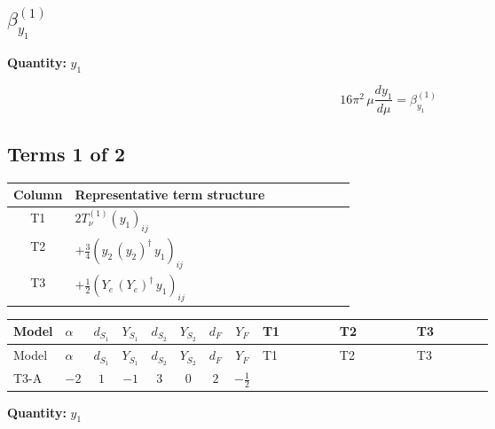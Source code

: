 \documentclass[8pt]{article}
\begin{document}
\begin{landscape}
\section*{$\beta_{y_1}^{(1)}$}
\noindent\textbf{Quantity: }$y_1$\par\smallskip
\[16\pi^2\,\mu\frac{d y_1}{d\mu}=\beta_{y_1}^{(1)}\]
\subsection*{Terms 1 of 2}
\begin{center}
\begin{tabular}{@{}c >{\raggedright\arraybackslash}p{0.82\linewidth}@{}}
\toprule
Column & Representative term structure \\
\midrule
T1 & \(\displaystyle 2 T_{\nu}^{(1)} \left({y_1}\right)_{ij}\) \\
\midrule
T2 & \(\displaystyle +\frac{3}{4} \left({y_2}\,\left({y_2}\right)^{\dagger}\,{y_1}\right)_{ij}\) \\
\midrule
T3 & \(\displaystyle +\frac{1}{2} \left({Y_e}\,\left({Y_e}\right)^{\dagger}\,{y_1}\right)_{ij}\) \\
\midrule
\bottomrule
\end{tabular}
\end{center}
\smallskip
\tiny
\begin{longtable}{@{}llcccccc >{\raggedright\arraybackslash}p{0.21\linewidth} >{\raggedright\arraybackslash}p{0.21\linewidth} >{\raggedright\arraybackslash}p{0.21\linewidth}@{}}
\toprule
Model & $\alpha$ & $d_{S_1}$ & $Y_{S_1}$ & $d_{S_2}$ & $Y_{S_2}$ & $d_F$ & $Y_F$ & T1 & T2 & T3 \\
\midrule
\endfirsthead
\toprule
Model & $\alpha$ & $d_{S_1}$ & $Y_{S_1}$ & $d_{S_2}$ & $Y_{S_2}$ & $d_F$ & $Y_F$ & T1 & T2 & T3 \\
\midrule
\endhead
T3-A & $-2$ & $1$ & $-1$ & $3$ & $0$ & $2$ & $-\frac{1}{2}$ & \scriptsize\adjustbox{max width=\linewidth}{$\begin{gathered} 2 T_{\nu}^{(1)} \left({y_1}\right)_{ij}\end{gathered}$} & \scriptsize\adjustbox{max width=\linewidth}{$\begin{gathered} +\frac{3}{4} \left({y_2}\,\left({y_2}\right)^{\dagger}\,{y_1}\right)_{ij}\end{gathered}$} & \scriptsize\adjustbox{max width=\linewidth}{$\begin{gathered} +\frac{1}{2} \left({Y_e}\,\left({Y_e}\right)^{\dagger}\,{y_1}\right)_{ij}\end{gathered}$} \\
\midrule
\bottomrule
\end{longtable}
\clearpage
\noindent\textbf{Quantity: }$y_1$\par\smallskip

\end{landscape}
\end{document}
